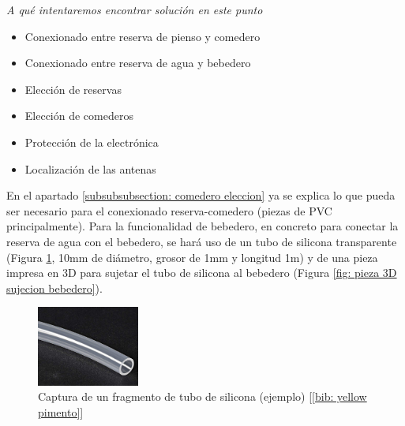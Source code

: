 \documentclass[12pt]{article}
\begin{document}
	\noindent \textit{A qué intentaremos encontrar solución en este punto} \\
	
	\begin{itemize}
		\item Conexionado entre reserva de pienso y comedero
		\item Conexionado entre reserva de agua y bebedero
		\item Elección de reservas
		\item Elección de comederos
		\item Protección de la electrónica
		\item Localización de las antenas
	\end{itemize}

	\noindent En el apartado \ref{subsubsubsection: comedero eleccion}  ya se explica lo que pueda ser necesario para el conexionado reserva-comedero (piezas de PVC principalmente). Para la funcionalidad de bebedero, en concreto para conectar la reserva de agua con el bebedero, se hará uso de un tubo de silicona transparente (Figura \ref{Captura tubo silicona}, 10mm de diámetro, grosor de 1mm y longitud 1m) y de una pieza impresa en 3D para sujetar el tubo de silicona al bebedero (Figura \ref{fig: pieza 3D sujecion bebedero}). \\
	
	
	
	\begin{figure}[h!]
		\begin{center}
			\includegraphics[width=0.30\textwidth]{img/tubo_silicona.png}
			\caption{Captura de un fragmento de tubo de silicona (ejemplo) [\ref{bib: yellow pimento}]}
			\label{Captura tubo silicona}
		\end{center}
	\end{figure}

	\pagebreak
	
\end{document}
